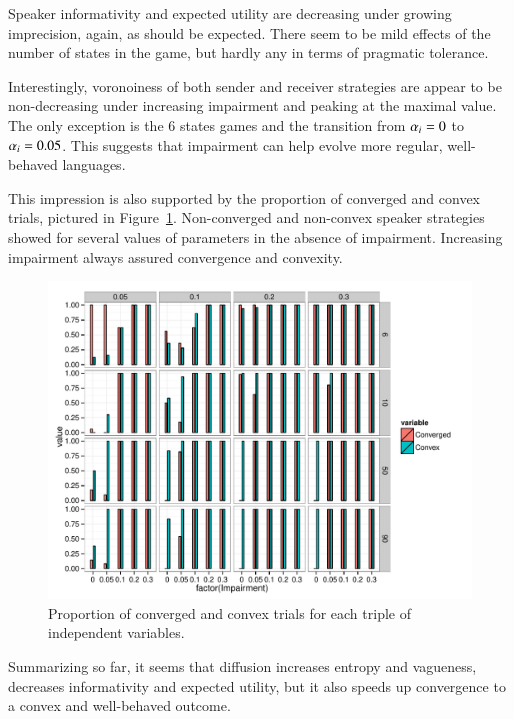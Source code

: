 Speaker informativity and expected utility are decreasing under
growing imprecision, again, as should be expected. There seem to be
mild effects of the number of states in the game, but hardly any in
terms of pragmatic tolerance. 

Interestingly, voronoiness of both sender and receiver strategies are
appear to be non-decreasing under increasing impairment and peaking at
the maximal value. The only exception is the 6 states games and the
transition from $\alpha_i = 0$ to $\alpha_i = 0.05$. This
suggests that impairment can help evolve more regular, well-behaved
languages.

This impression is also supported by the proportion of converged and
convex trials, pictured in
Figure~\ref{fig:CategoricalMeasures}. Non-converged and non-convex
speaker strategies showed for several values of parameters in the
absence of impairment. Increasing impairment always assured
convergence and convexity.

\begin{figure}
  \centering
  
  \includegraphics[width=\textwidth]{plots/CategoricalMeasures.pdf}

  \caption{Proportion of converged and convex trials for each triple
    of independent variables.}
  \label{fig:CategoricalMeasures}
\end{figure}

Summarizing so far, it seems that diffusion increases entropy and
vagueness, decreases informativity and expected utility, but it also
speeds up convergence to a convex and well-behaved outcome.

